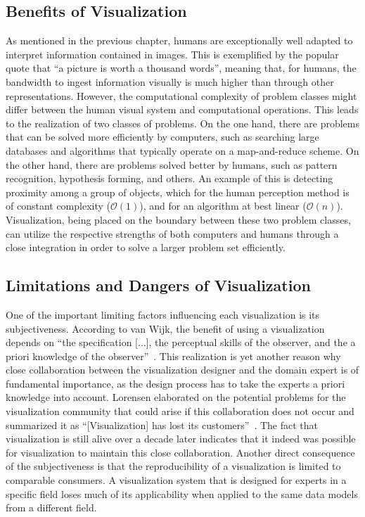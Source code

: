 \subsection{Benefits of Visualization} \label{cha:intro:vis:benefits}
As mentioned in the previous chapter, humans are exceptionally well adapted to interpret information contained in images.  This is exemplified by the popular quote that ``a picture is worth a thousand words'', meaning that, for humans, the bandwidth to ingest information visually is much higher than through other representations.  However, the computational complexity of problem classes might differ between the human visual system and computational operations.  This leads to the realization of two classes of problems.  On the one hand, there are problems that can be solved more efficiently by computers, such as searching large databases and algorithms that typically operate on a map-and-reduce scheme.  On the other hand, there are problems solved better by humans, such as pattern recognition, hypothesis forming, and others.  An example of this is detecting proximity among a group of objects, which for the human perception method is of constant complexity ($\mathcal{O}\left( 1 \right)$), and for an algorithm at best linear ($\mathcal{O}\left( n \right)$).  Visualization, being placed on the boundary between these two problem classes, can utilize the respective strengths of both computers and humans through a close integration in order to solve a larger problem set efficiently.

\subsection{Limitations and Dangers of Visualization} \label{cha:intro:vis:limitations}
One of the important limiting factors influencing each visualization is its subjectiveness.  According to van Wijk, the benefit of using a visualization depends on ``the specification [...], the perceptual skills of the observer, and the a priori knowledge of the observer''~\cite{van2005value}.  This realization is yet another reason why close collaboration between the visualization designer and the domain expert is of fundamental importance, as the design process has to take the experts a priori knowledge into account.  Lorensen elaborated on the potential problems for the visualization community that could arise if this collaboration does not occur and summarized it as ``[Visualization] has lost its customers''~\cite{lorensen2004death}.  The fact that visualization is still alive over a decade later indicates that it indeed was possible for visualization to maintain this close collaboration.  Another direct consequence of the subjectiveness is that the reproducibility of a visualization is limited to comparable consumers.  A visualization system that is designed for experts in a specific field loses much of its applicability when applied to the same data models from a different field.

